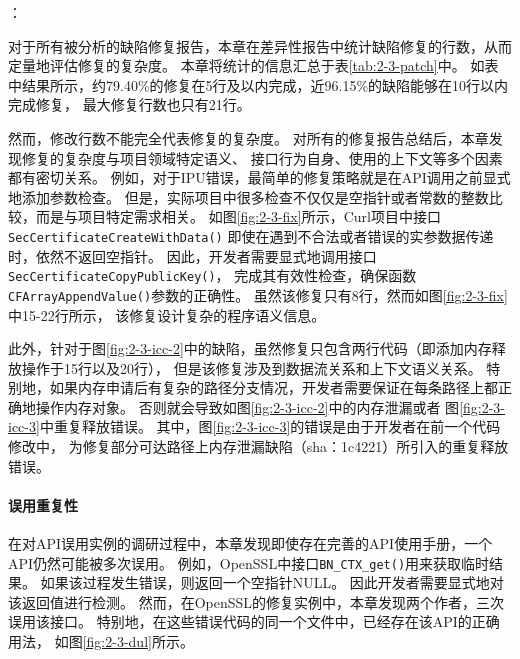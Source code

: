 {}：

对于所有被分析的缺陷修复报告，本章在差异性报告中统计缺陷修复的行数，从而定量地评估修复的复杂度。
本章将统计的信息汇总于表\ref{tab:2-3-patch}中。
如表中结果所示，约79.40\%的修复在5行及以内完成，近96.15\%的缺陷能够在10行以内完成修复，
最大修复行数也只有21行。



然而，修改行数不能完全代表修复的复杂度。
对所有的修复报告总结后，本章发现修复的复杂度与项目领域特定语义、
接口行为自身、使用的上下文等多个因素都有密切关系。
例如，对于IPU错误，最简单的修复策略就是在API调用之前显式地添加参数检查。
但是，实际项目中很多检查不仅仅是空指针或者常数的整数比较，而是与项目特定需求相关。
如图\ref{fig:2-3-fix}所示，Curl项目中接口\texttt{SecCertificateCreateWithData()}
即使在遇到不合法或者错误的实参数据传递时，依然不返回空指针。
因此，开发者需要显式地调用接口\texttt{SecCertificateCopyPublicKey()}，
完成其有效性检查，确保函数\texttt{CFArrayAppendValue()}参数的正确性。
虽然该修复只有8行，然而如图\ref{fig:2-3-fix}中15-22行所示，
该修复设计复杂的程序语义信息。


此外，针对于图\ref{fig:2-3-icc-2}中的缺陷，虽然修复只包含两行代码（即添加内存释放操作于15行以及20行），
但是该修复涉及到数据流关系和上下文语义关系。
特别地，如果内存申请后有复杂的路径分支情况，开发者需要保证在每条路径上都正确地操作内存对象。
否则就会导致如图\ref{fig:2-3-icc-2}中的内存泄漏或者
图\ref{fig:2-3-icc-3}中重复释放错误。
其中，图\ref{fig:2-3-icc-3}的错误是由于开发者在前一个代码修改中，
为修复部分可达路径上内存泄漏缺陷（sha：1c4221）所引入的重复释放错误。

\vspace*{10pt}
\begin{center}
	\noindent{}
\end{center}



\paragraph{误用重复性}
在对API误用实例的调研过程中，本章发现即使存在完善的API使用手册，一个API仍然可能被多次误用。
例如，OpenSSL中接口\texttt{BN\_CTX\_get()}用来获取临时结果。
如果该过程发生错误，则返回一个空指针NULL。
因此开发者需要显式地对该返回值进行检测。
然而，在OpenSSL的修复实例中，本章发现两个作者，三次误用该接口。
特别地，在这些错误代码的同一个文件中，已经存在该API的正确用法，
如图\ref{fig:2-3-dul}所示。

